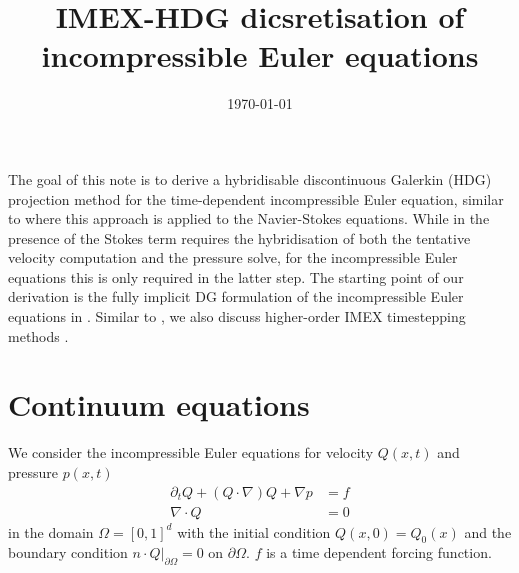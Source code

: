 \documentclass[11pt]{article}
\title{IMEX-HDG dicsretisation of incompressible Euler equations}
\date{\today}
\begin{document}
\maketitle
The goal of this note is to derive a hybridisable discontinuous Galerkin (HDG) projection method \cite{Chorin1968} for the time-dependent incompressible Euler equation, similar to \cite{Ueckermann2016} where this approach is applied to the Navier-Stokes equations. While in \cite{Ueckermann2016} the presence of the Stokes term requires the hybridisation of both the tentative velocity computation and the pressure solve, for the incompressible Euler equations this is only required in the latter step. The starting point of our derivation is the fully implicit DG formulation of the incompressible Euler equations in \cite{Guzman2016}. Similar to \cite{Ueckermann2016}, we also discuss higher-order IMEX timestepping methods \cite{Ascher1997}.
\section{Continuum equations}
We consider the incompressible Euler equations for velocity $Q(x,t)$ and pressure $p(x,t)$
\begin{equation}
    \begin{aligned}
        \partial_t Q + (Q\cdot \nabla) Q + \nabla p & = f \\
        \nabla\cdot Q                               & = 0
    \end{aligned}\label{eqn:incompressible_euler}
\end{equation}
in the domain $\Omega=[0,1]^d$ with the initial condition $Q(x,0) = Q_0(x)$ and the boundary condition \mbox{$n\cdot Q\vert_{\partial \Omega}=0$} on $\partial\Omega$. $f$ is a time dependent forcing function.
\end{document}
